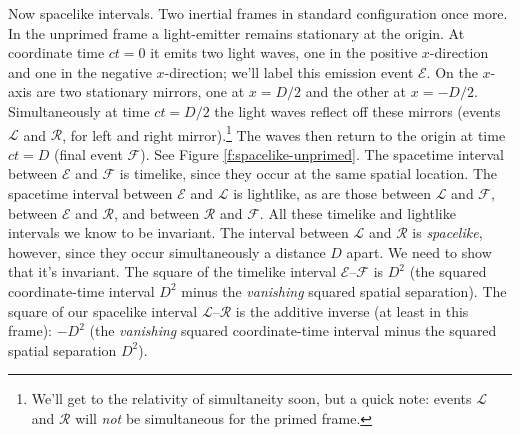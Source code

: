 \documentclass[12pt]{article}
\begin{document}
Now spacelike intervals. Two inertial frames in standard configuration once more. In the unprimed frame a light-emitter remains stationary at the origin. At coordinate time $ct = 0$ it emits two light waves, one in the positive $x$-direction and one in the negative $x$-direction; we'll label this emission event $\mathcal{E}$. On the $x$-axis are two stationary mirrors, one at $x = D/2$ and the other at $x = -D/2$. Simultaneously at time $ct = D / 2$ the light waves reflect off these mirrors (events $\mathcal{L}$ and $\mathcal{R}$, for left and right mirror).\footnote{We'll get to the relativity of simultaneity soon, but a quick note: events $\mathcal{L}$ and $\mathcal{R}$ will \emph{not} be simultaneous for the primed frame.} The waves then return to the origin at time $ct = D$ (final event $\mathcal{F}$). See Figure \ref{f:spacelike-unprimed}. The spacetime interval between $\mathcal{E}$ and $\mathcal{F}$ is timelike, since they occur at the same spatial location. The spacetime interval between $\mathcal{E}$ and $\mathcal{L}$ is lightlike, as are those between $\mathcal{L}$ and $\mathcal{F}$, between $\mathcal{E}$ and $\mathcal{R}$, and between $\mathcal{R}$ and $\mathcal{F}$. All these timelike and lightlike intervals we know to be invariant. The interval between $\mathcal{L}$ and $\mathcal{R}$ is \emph{spacelike}, however, since they occur simultaneously a distance $D$ apart. We need to show that it's invariant. The square of the timelike interval $\mathcal{E}$--$\mathcal{F}$ is $D^2$ (the squared coordinate-time interval $D^2$ minus the \emph{vanishing} squared spatial separation). The square of our spacelike interval $\mathcal{L}$--$\mathcal{R}$ is the additive inverse (at least in this frame): $-D^2$ (the \emph{vanishing} squared coordinate-time interval minus the squared spatial separation $D^2$).
\end{document}
